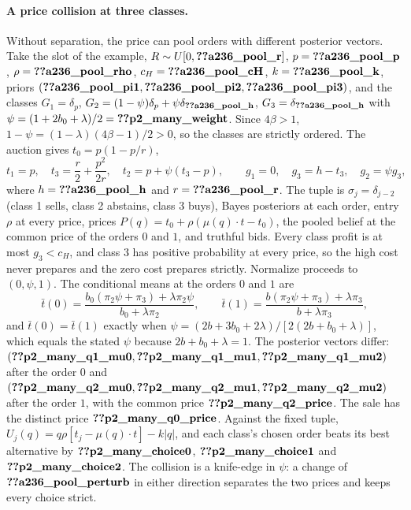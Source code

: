 \paragraph{A price collision at three classes.}
Without separation, the price can pool orders with different posterior vectors. Take the slot of the example,
\(R\sim U[0,\reg{a236_pool_r}]\), \(p=\reg{a236_pool_p}\), \(\rho=\reg{a236_pool_rho}\), \(c_H=\reg{a236_pool_cH}\), \(k=\reg{a236_pool_k}\), priors \((\reg{a236_pool_pi1},\reg{a236_pool_pi2},\reg{a236_pool_pi3})\), and the classes
\(G_1=\delta_p\), \(G_2=(1-\psi)\delta_p+\psi\delta_{\reg{a236_pool_h}}\), \(G_3=\delta_{\reg{a236_pool_h}}\) with \(\psi=(1+2b_0+\lambda)/2=\reg{p2_many_weight}\).
Since \(4\beta>1\), \(1-\psi=(1-\lambda)(4\beta-1)/2>0\), so the classes are strictly ordered. The auction gives \(t_0=p(1-p/r)\),
\[
t_1=p,\quad t_3=\frac r2+\frac{p^2}{2r},\quad t_2=p+\psi(t_3-p),\qquad
g_1=0,\quad g_3=h-t_3,\quad g_2=\psi g_3,
\]
where \(h=\reg{a236_pool_h}\) and \(r=\reg{a236_pool_r}\). The tuple is
\(\sigma_j=\delta_{j-2}\) (class 1 sells, class 2 abstains, class 3 buys), Bayes posteriors at each order, entry \(\rho\)
at every price, prices \(P(q)=t_0+\rho(\mu(q)\cdot t-t_0)\), the pooled belief at the common price of the orders \(0\)
and \(1\), and truthful bids. Every class profit is at most \(g_3<c_H\), and class 3 has positive probability at every
price, so the high cost never prepares and the zero cost prepares strictly. Normalize proceeds to \((0,\psi,1)\). The
conditional means at the orders \(0\) and \(1\) are
\[
\bar t(0)=\frac{b_0(\pi_2\psi+\pi_3)+\lambda\pi_2\psi}{b_0+\lambda\pi_2},\qquad
\bar t(1)=\frac{b(\pi_2\psi+\pi_3)+\lambda\pi_3}{b+\lambda\pi_3},
\]
and \(\bar t(0)=\bar t(1)\) exactly when \(\psi=(2b+3b_0+2\lambda)/[2(2b+b_0+\lambda)]\), which equals the stated \(\psi\) because
\(2b+b_0+\lambda=1\). The posterior vectors differ: \((\reg{p2_many_q1_mu0},\reg{p2_many_q1_mu1},\reg{p2_many_q1_mu2})\)
after the order \(0\) and \((\reg{p2_many_q2_mu0},\reg{p2_many_q2_mu1},\reg{p2_many_q2_mu2})\) after the order \(1\),
with the common price \(\reg{p2_many_q2_price}\). The sale has the distinct price \(\reg{p2_many_q0_price}\). Against
the fixed tuple, \(U_j(q)=q\rho[t_j-\mu(q)\cdot t]-k|q|\), and each class's chosen order beats its best alternative
by \(\reg{p2_many_choice0}\), \(\reg{p2_many_choice1}\) and \(\reg{p2_many_choice2}\). The collision is a knife-edge in
\(\psi\): a change of \(\reg{a236_pool_perturb}\) in either direction separates the two prices and keeps every choice strict.

